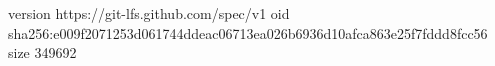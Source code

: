 version https://git-lfs.github.com/spec/v1
oid sha256:e009f2071253d061744ddeac06713ea026b6936d10afca863e25f7fddd8fcc56
size 349692
